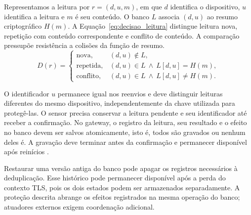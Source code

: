 Representamos a leitura por \(r=(d,u,m)\), em que \(d\) identifica o dispositivo, \(u\) identifica a leitura e \(m\) é seu conteúdo. O banco \(L\) associa \((d,u)\) ao resumo criptográfico \(H(m)\). A Equação~\ref{eq:decisao_leitura} distingue leitura nova, repetição com conteúdo correspondente e conflito de conteúdo. A comparação pressupõe resistência a colisões da função de resumo.
\begin{equation}
D(r)=\begin{cases}
\mathrm{nova}, & (d,u)\notin L,\\
\mathrm{repetida}, & (d,u)\in L\ \land\ L[d,u]=H(m),\\
\mathrm{conflito}, & (d,u)\in L\ \land\ L[d,u]\neq H(m).
\end{cases}
\label{eq:decisao_leitura}
\end{equation}

O identificador \(u\) permanece igual nos reenvios e deve distinguir leituras diferentes do mesmo dispositivo, independentemente da chave utilizada para protegê-las. O sensor precisa conservar a leitura pendente e seu identificador até receber a confirmação. No gateway, o registro da leitura, seu resultado e o efeito no banco devem ser salvos atomicamente, isto é, todos são gravados ou nenhum deles é. A gravação deve terminar antes da confirmação e permanecer disponível após reinícios \cite{lee2015rifl}.

Restaurar uma versão antiga do banco pode apagar os registros necessários à deduplicação. Esse histórico pode permanecer disponível após a perda do contexto TLS, pois os dois estados podem ser armazenados separadamente. A proteção descrita abrange os efeitos registrados na mesma operação do banco; atuadores externos exigem coordenação adicional.

\FloatBarrier
